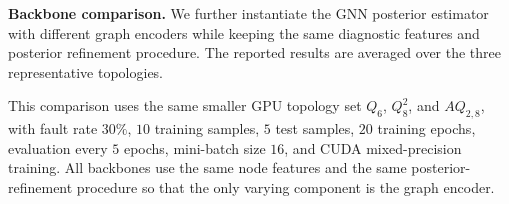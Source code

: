 \noindent\textbf{Backbone comparison.}
We further instantiate the GNN posterior estimator with different graph encoders while keeping the same diagnostic features and posterior refinement procedure. The reported results are averaged over the three representative topologies.

This comparison uses the same smaller GPU topology set $Q_6$, $Q_8^2$, and $AQ_{2,8}$, with fault rate $30\%$, $10$ training samples, $5$ test samples, $20$ training epochs, evaluation every $5$ epochs, mini-batch size $16$, and CUDA mixed-precision training. All backbones use the same node features and the same posterior-refinement procedure so that the only varying component is the graph encoder.

\begin{table}[t]
\centering
\caption{Complete topology-wise results for the backbone comparison study.}
\label{tab:rq3_backbone_detail}
\vspace{1mm}
\end{table}


